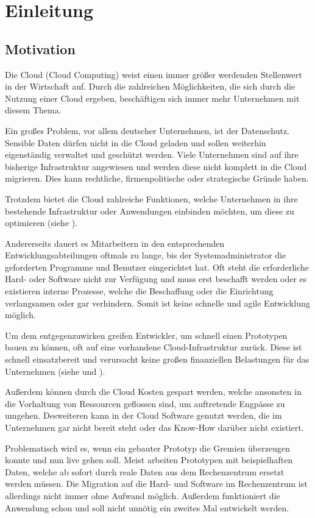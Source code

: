 \chapter{Einleitung}
\label{cha:einleitung}

\section{Motivation}
Die Cloud (Cloud Computing) weist einen immer größer werdenden Stellenwert in der Wirtschaft auf. Durch die zahlreichen
Möglichkeiten, die sich durch die Nutzung einer Cloud ergeben, beschäftigen sich immer mehr Unternehmen mit diesem Thema.

Ein großes Problem, vor allem deutscher Unternehmen, ist der Datenschutz. Sensible Daten dürfen nicht in die Cloud geladen
und sollen weiterhin eigenständig verwaltet und geschützt werden. Viele Unternehmen sind auf ihre bisherige Infrastruktur
angewiesen und werden diese nicht komplett in die Cloud migrieren. Dies kann rechtliche, firmenpolitische oder strategische
Gründe haben.

Trotzdem  bietet die Cloud zahlreiche Funktionen, welche Unternehmen in ihre bestehende Infrastruktur oder Anwendungen
einbinden möchten, um diese zu optimieren (siehe \cite{online_einleitung_datensicherheit}).

Andererseits dauert es Mitarbeitern in den entsprechenden Entwicklungsabteilungen oftmals zu lange, bis der Systemadministrator
die geforderten Programme und Benutzer eingerichtet hat. Oft steht die erforderliche Hard- oder Software nicht zur
Verfügung und muss erst beschafft werden oder es existieren interne Prozesse, welche die Beschaffung oder die Einrichtung
verlangsamen oder gar verhindern. Somit ist keine schnelle und agile Entwicklung möglich.

Um dem entgegenzuwirken greifen Entwickler, um schnell einen Prototypen bauen zu können, oft auf eine vorhandene
Cloud-Infrastruktur zurück. Diese ist schnell einsatzbereit und verursacht keine großen finanziellen Belastungen für das
Unternehmen (siehe \cite{online_einleitung_cloud} und \cite{online_grundlagen_cloudusage}).

Außerdem können durch die Cloud Kosten gespart werden, welche ansonsten in die Vorhaltung von Ressourcen geflossen sind,
um auftretende Engpässe zu umgehen. Desweiteren kann in der Cloud Software genutzt werden, die im Unternehmen gar nicht
bereit steht oder das Know-How darüber nicht existiert.

Problematisch wird es, wenn ein gebauter Prototyp die Gremien überzeugen konnte und nun live gehen soll. Meist arbeiten
Prototypen mit beispielhaften Daten, welche ab sofort durch reale Daten aus dem Rechenzentrum ersetzt werden müssen. Die
Migration auf die Hard- und Software im Rechenzentrum ist allerdings nicht immer ohne Aufwand möglich. Außerdem funktioniert
die Anwendung schon und soll nicht unnötig ein zweites Mal entwickelt werden.

